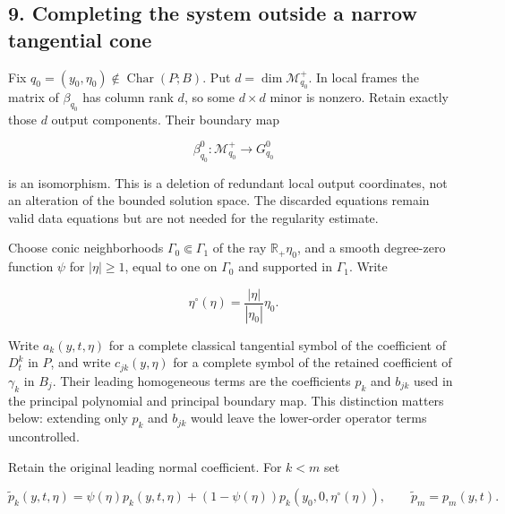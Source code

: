 \documentclass[
  11pt,
]{article}
\makeatletter
\let\ReaderOriginalAnchorStart\hyper@anchorstart
\let\ReaderOriginalAnchorEnd\hyper@anchorend
\let\ReaderPendingAliases\@empty
\def\ReaderArmAliases#1{\gdef\ReaderPendingAliases{#1}}
\def\hyper@anchorstart#1{\ReaderIfNativeAnchorTF{#1}{\ReaderPendingAliases\global\let\ReaderPendingAliases\@empty}{}\ReaderOriginalAnchorStart{#1}}
\makeatother
\begin{document}
\ReaderArmAliases{\ReaderOriginalAnchorStart{AN03-BWF-009}\ReaderOriginalAnchorEnd\begingroup\expandafter\def\csname @currentHref\endcsname{AN03-BWF-009}\label{AN03-BWF-009}\endgroup\ReaderOriginalAnchorStart{9-completing-the-system-outside-a-narrow-tangential-cone}\ReaderOriginalAnchorEnd\begingroup\expandafter\def\csname @currentHref\endcsname{9-completing-the-system-outside-a-narrow-tangential-cone}\label{9-completing-the-system-outside-a-narrow-tangential-cone}\endgroup}
\subsection{9. Completing the system outside a narrow tangential
cone}\label{completing-the-system-outside-a-narrow-tangential-cone}

Fix \(q_0=(y_0,\eta_0)\notin\operatorname{Char}(P;B)\). Put
\(d=\dim\mathscr M^+_{q_0}\). In local frames the matrix of
\(\beta_{q_0}\) has column rank \(d\), so some \(d\times d\) minor is
nonzero. Retain exactly those \(d\) output components. Their boundary
map

\[
 \beta^0_{q_0}:\mathscr M^+_{q_0}\longrightarrow G^0_{q_0}
 \tag{BW36}
\]

is an isomorphism. This is a deletion of redundant local output
coordinates, not an alteration of the bounded solution space. The
discarded equations remain valid data equations but are not needed for
the regularity estimate.

Choose conic neighborhoods \(\Gamma_0\Subset\Gamma_1\) of the ray
\(\mathbb R_+\eta_0\), and a smooth degree-zero function \(\psi\) for
\(|\eta|\geq1\), equal to one on \(\Gamma_0\) and supported in
\(\Gamma_1\). Write

\[
 \eta^\circ(\eta)=\frac{|\eta|}{|\eta_0|}\eta_0.
 \tag{BW37}
\]

Write \(a_k(y,t,\eta)\) for a complete classical tangential symbol of
the coefficient of \(D_t^k\) in \(P\), and write \(c_{jk}(y,\eta)\) for
a complete symbol of the retained coefficient of \(\gamma_k\) in
\(B_j\). Their leading homogeneous terms are the coefficients \(p_k\)
and \(b_{jk}\) used in the principal polynomial and principal boundary
map. This distinction matters below: extending only \(p_k\) and
\(b_{jk}\) would leave the lower-order operator terms uncontrolled.

Retain the original leading normal coefficient. For \(k<m\) set

\[
 \widetilde p_k(y,t,\eta)
 =\psi(\eta)p_k(y,t,\eta)
 +(1-\psi(\eta))p_k(y_0,0,\eta^\circ(\eta)),
 \qquad \widetilde p_m=p_m(y,t).
 \tag{BW38}
\]
\end{document}

